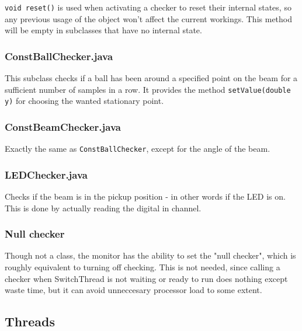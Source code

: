 \texttt{void reset()} is used when activating a checker to reset their internal states, so any previous usage of the object won't  affect the current workings. This method will be empty in subclasses that have no internal state.


\subsubsection{ConstBallChecker.java}
This subclass checks if a ball has been around a specified point on the beam for a sufficient number of samples in a row. It provides the method \texttt{setValue(double y)} for choosing the wanted stationary point.

\subsubsection{ConstBeamChecker.java}
Exactly the same as \texttt{ConstBallChecker}, except for the angle of the beam.

\subsubsection{LEDChecker.java}
Checks if the beam is in the pickup position - in other words if the LED is on. This is done by actually reading the digital in channel.

\subsubsection{Null checker}
Though not a class, the monitor has the ability to set the "null checker", which is roughly equivalent to turning off checking. This is not needed, since calling a checker when SwitchThread is not waiting or ready to run does nothing except waste time, but it can avoid unneccesary processor load to some extent.








\subsection{Threads}\label{Threads}

